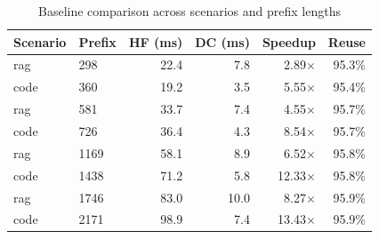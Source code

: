 \begin{table}[t]
\centering
\caption{Baseline comparison across scenarios and prefix lengths}
\label{tab:baseline_comparison}
\begin{tabular}{llrrrr}
\toprule
Scenario & Prefix & HF (ms) & DC (ms) & Speedup & Reuse \\
\midrule
rag & 298 & 22.4 & 7.8 & 2.89$\times$ & 95.3\% \\
code & 360 & 19.2 & 3.5 & 5.55$\times$ & 95.4\% \\
rag & 581 & 33.7 & 7.4 & 4.55$\times$ & 95.7\% \\
code & 726 & 36.4 & 4.3 & 8.54$\times$ & 95.7\% \\
rag & 1169 & 58.1 & 8.9 & 6.52$\times$ & 95.8\% \\
code & 1438 & 71.2 & 5.8 & 12.33$\times$ & 95.8\% \\
rag & 1746 & 83.0 & 10.0 & 8.27$\times$ & 95.9\% \\
code & 2171 & 98.9 & 7.4 & 13.43$\times$ & 95.9\% \\
\bottomrule
\end{tabular}
\end{table}